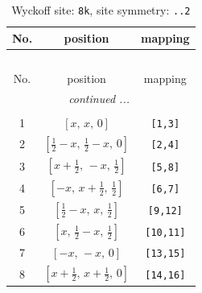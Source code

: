 \documentclass[fleqn,8pt]{jsarticle}
\begin{document}
\begin{longtable}{ccc}
\caption{Wyckoff site: {\tt 8k}, site symmetry: {\tt ..2}}
 \\
 \hline \hline
No. & position & mapping \\ \hline \endfirsthead

\multicolumn{2}{l}{\tablename\ \thetable{}} \\
 \hline \hline
No. & position & mapping \\ \hline \endhead

 \hline \hline
\multicolumn{2}{r}{\footnotesize\it continued ...} \\ \endfoot

 \hline \hline
\multicolumn{2}{r}{} \\ \endlastfoot

1 & $\left[ x,\, x,\, 0 \right]$ & {\tt [1,3]} \\ \hline
2 & $\left[ \frac{1}{2} - x,\, \frac{1}{2} - x,\, 0 \right]$ & {\tt [2,4]} \\ \hline
3 & $\left[ x + \frac{1}{2},\, - x,\, \frac{1}{2} \right]$ & {\tt [5,8]} \\ \hline
4 & $\left[ - x,\, x + \frac{1}{2},\, \frac{1}{2} \right]$ & {\tt [6,7]} \\ \hline
5 & $\left[ \frac{1}{2} - x,\, x,\, \frac{1}{2} \right]$ & {\tt [9,12]} \\ \hline
6 & $\left[ x,\, \frac{1}{2} - x,\, \frac{1}{2} \right]$ & {\tt [10,11]} \\ \hline
7 & $\left[ - x,\, - x,\, 0 \right]$ & {\tt [13,15]} \\ \hline
8 & $\left[ x + \frac{1}{2},\, x + \frac{1}{2},\, 0 \right]$ & {\tt [14,16]} \\
\end{longtable}
\renewcommand{\arraystretch}{1.2}
\end{document}
